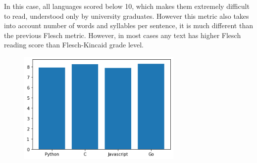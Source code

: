 \documentclass[]{article}
\begin{document}
In this case, all languages scored below 10, which makes them extremely difficult to read, understood only by university graduates. However this metric also takes into account number of words and syllables per sentence, it is much different than the previous Flesch metric. However, in most cases any text has higher Flesch reading score than Flesch-Kincaid grade level. 

    \begin{figure}[H]
    \includegraphics[width=8cm]{resources/flesh_kincaid.png}
    \centering
    \end{figure}


\end{document}
